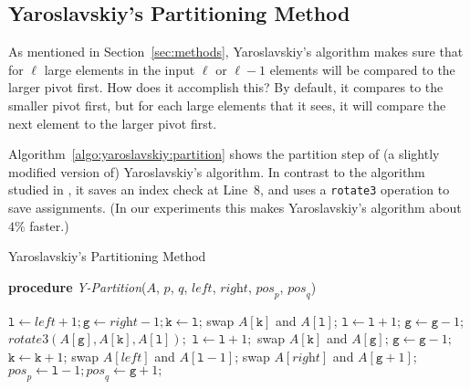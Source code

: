 \documentclass[prodmode,acmtalg]{acmsmall}
\begin{document}
\subsection{Yaroslavskiy's Partitioning Method}\label{app:sec:yaroslavskiy}
As mentioned in Section~\ref{sec:methods}, Yaroslavskiy's algorithm makes sure that for
$\ell$ large elements in the input $\ell$ or $\ell - 1$ elements will be compared to
the larger pivot first. How does it accomplish this? By default, it
compares to the smaller pivot first, but for each large
elements that it sees, it will compare the next element to the larger pivot
first.

Algorithm~\ref{algo:yaroslavskiy:partition} shows the partition step of (a slightly modified version of) 
Yaroslavskiy's algorithm. In contrast to the algorithm
studied in \cite{nebel12}, it saves an index check at Line~8, and uses a \texttt{rotate3} operation
to save assignments. (In our experiments this makes Yaroslavskiy's algorithm about $4\%$ faster.)

\begin{algorithm}
    \caption{Yaroslavskiy's Partitioning Method}\samepage\label{algo:yaroslavskiy:partition}
		\textbf{procedure} \textit{Y-Partition}($\textit{A}$, $\textit{p}$, $\textit{q}$, $\textit{left}$,
		$\textit{right}$, $\textit{pos}_{\textit{p}}$, $\textit{pos}_{\textit{q}}$)
    \begin{algorithmic}[1]
		\State $\texttt{l} \gets \textit{left} +1; \texttt{g}
		\gets \textit{right} - 1; \texttt{k} \gets \texttt{l}$;
                        \State swap $\textit{A}[\texttt{k}]$ and $\textit{A}[\texttt{l}]$;
                        \State $\texttt{l} \gets\texttt{l} + 1$;
                    \Else
                                \State $\texttt{g} \gets \texttt{g} - 1$;
                            \EndWhile
                                    \State $\textit{rotate3}(\textit{A}[\texttt{g}], 
                                    \textit{A}[\texttt{k}], \textit{A}[\texttt{l}]);$
                                    \State $\texttt{l} \gets \texttt{l} + 1;$
                                \Else
                                    \State swap $\textit{A}[\texttt{k}]$ and $\textit{A}[\texttt{g}]$;
                                \EndIf
                                \State $\texttt{g} \gets \texttt{g} - 1;$
                            \EndIf
                        \EndIf
                    \EndIf
                    \State $\texttt{k} \gets \texttt{k} + 1$;
		\EndWhile
                \State swap $\textit{A}[\textit{left}]$ and $\textit{A}[\texttt{l}-1]$;
		\State swap  $\textit{A}[\textit{right}]$ and $\textit{A}[\texttt{g}+1]$;
	        \State $\textit{pos}_{\textit{p}} \gets \texttt{l} - 1;  \textit{pos}_{\textit{q}} \gets \texttt{g} + 1;$
    \end{algorithmic}
\end{algorithm}
\end{document}

